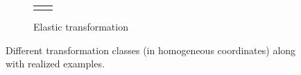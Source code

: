 \begin{figure}
\begin{subfigure}{\linewidth}
\begin{tabular}{>{\centering}p{4cm}c}
{{				}
			}
			\)
		\end{tabular}
		\caption{Elastic transformation} \label{fig:elastictransformation}
	\end{subfigure}
	\caption[Compact Routing Example]{Different transformation classes (in homogeneous coordinates) along with realized examples.}
	\label{fig:transformations}
\end{figure}
